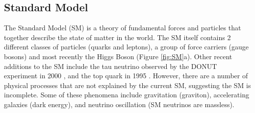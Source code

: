 \documentclass[12pt]{article}
\begin{document}
\subsection{Standard Model}
The Standard Model (SM) is a theory of fundamental forces and particles that together describe the state of matter in the world. The SM itself contains 2 different classes of particles (quarks and leptons), a group of force carriers (gauge bosons) and most recently the Higgs Boson (Figure \ref{fig:SM}a). Other recent additions to the SM include the tau neutrino observed by the DONUT experiment in 2000 \cite{bib:donut}, and the top quark in 1995 \cite{bib:cdf}. However, there are a number of physical processes that are not explained by the current SM, suggesting the SM is incomplete.  Some of these phenomena include gravitation (graviton), accelerating galaxies (dark energy), and neutrino oscillation (SM neutrinos are massless). 
\end{document}
